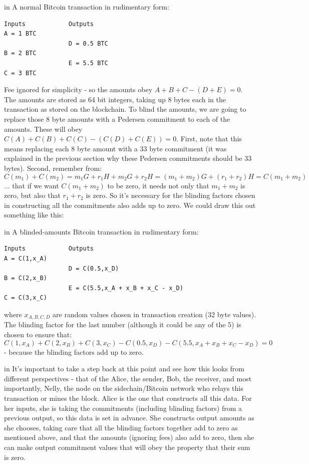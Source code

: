 \documentclass[10pt,a4paper]{article}
\begin{document}
 in \noindent A normal Bitcoin transaction in rudimentary form:
\begin{verbatim}
Inputs            Outputs
A = 1 BTC
                  D = 0.5 BTC
B = 2 BTC
                  E = 5.5 BTC
C = 3 BTC
\end{verbatim}

Fee ignored for simplicity - so the amounts obey $A + B + C - (D + E) = 0$. The amounts are stored as 64 bit integers, taking up 8 bytes each in the transaction as stored on the blockchain. To blind the amounts, we are going to replace those 8 byte amounts with a Pedersen commitment to each of the amounts. These will obey $C(A) + C(B) + C(C) - (C(D) + C(E)) = 0$. First, note that this means replacing each 8 byte amount with a 33 byte commitment (it was explained in the previous section why these Pedersen commitments should be 33 bytes). Second, remember from:
\[C(m_1) + C(m_2) = m_{1}G + r_{1}H + m_{2}G +r_{2}H = (m_1+m_2)G +(r_1 + r_2)H = C(m_1+m_2) \]
... that if we want $C(m_1 + m_2 )$ to be zero, it needs not only that $m_1 + m_2 $ is zero, but also that $r_1 + r_2 $ is zero. So it's necessary for the blinding factors chosen in constructing all the commitments also adds up to zero. We could draw this out something like this:

 in \noindent A blinded-amounts Bitcoin transaction in rudimentary form:
\begin{verbatim}
Inputs            Outputs
A = C(1,x_A)
                  D = C(0.5,x_D)
B = C(2,x_B)
                  E = C(5.5,x_A + x_B + x_C - x_D)
C = C(3,x_C)
\end{verbatim}

where $x_{A,B,C,D}$ are random values chosen in transaction creation (32 byte values). The blinding factor for the last number (although it could be any of the 5) is chosen to ensure that:
\[C(1,x_A) + C(2,x_B) + C(3,x_C) - C(0.5,x_D) - C(5.5,x_A + x_B + x_C - x_D) = 0\]
- because the blinding factors add up to zero.

 in \noindent It's important to take a step back at this point and see how this looks from different perspectives - that of the Alice, the sender, Bob, the receiver, and most importantly, Nelly, the node on the sidechain/Bitcoin network who relays this transaction or mines the block. Alice is the one that constructs all this data. For her inputs, she is taking the commitments (including blinding factors) from a previous output, so this data is set in advance. She constructs output amounts as she chooses, taking care that all the blinding factors together add to zero as mentioned above, and that the amounts (ignoring fees) also add to zero, then she can make output commitment values that will obey the property that their sum is zero.
\end{document}
